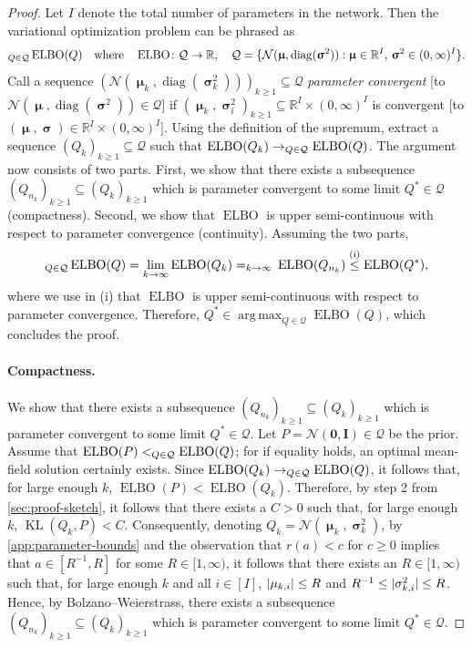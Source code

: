 \documentclass[twoside]{article}
\newcommand{\vnull}{\mathbf{0}}
\newcommand{\vmu}{\bm{\upmu}}
\newcommand{\vsigma}{\bm{\upsigma}}
\newcommand{\mI}{\mathbf{I}}
\newcommand{\Q}{\mathbb{Q}}
\renewcommand{\Q}{\ensuremath{Q}}
\newcommand{\R}{\mathbb{R}}
\newcommand{\sub}{\subseteq}
\newcommand{\opspace}{}
\DeclareMathOperator*{\argmax}{arg\,max\opspace}
\let\sup\relax\DeclareMathOperator*{\sup}{sup\opspace}
\let\limsup\relax\DeclareMathOperator*{\limsup}{lim\,sup\opspace}
\newcommand{\diag}{\operatorname{diag}\opspace}
\newcommand{\KL}{\operatorname{KL}}
\newcommand{\Normal}{\mathcal{N}}
\DeclarePairedDelimiter\set{\{}{\}}              %
\DeclarePairedDelimiter\abs{|}{|}                %
\theoremstyle{theoremstyle}
\begin{document}
\begin{proof}
Let $I$ denote the total number of parameters in the network.
Then the variational optimization problem can be phrased as 
\newcommand{\ELBO}{\operatorname{ELBO}}
\begin{align}
    \sup_{\Q \in \mathcal{Q}} \operatorname{ELBO}(\Q) \quad \text{where}
    \quad \ELBO \colon \mathcal{Q} \to \R,
    \quad \mathcal{Q} = \set{
        \Normal(\vmu, \diag(\vsigma^2)) : \vmu \in \R^I, \, \vsigma^2 \in (0, \infty)^I
    }.
\end{align}
Call a sequence $(\Normal(\vmu_k, \diag(\vsigma_k^2)))_{k \ge 1} \sub \mathcal{Q}$ \emph{parameter convergent} [to $\Normal(\vmu, \diag(\vsigma^2)) \in \mathcal{Q}$] if $(\vmu_k, \vsigma_i^2)_{k \ge 1} \sub \R^I \times (0, \infty)^I$ is convergent [to $(\vmu, \vsigma) \in \R^I \times (0, \infty)^I$].
Using the definition of the supremum, extract a sequence $(Q_k)_{k \ge 1} \sub \mathcal{Q}$ such that $\ELBO(Q_k) \to \sup_{\Q \in \mathcal{Q}} \operatorname{ELBO}(\Q)$.
The argument now consists of two parts.
First, we show that there exists a subsequence $(Q_{n_k})_{k \ge 1} \sub (Q_k)_{k \ge 1}$ which is parameter convergent to some limit $Q^* \in \mathcal{Q}$ (compactness).
Second, we show that $\ELBO$ is upper semi-continuous with respect to parameter convergence (continuity).
Assuming the two parts,
\begin{align}
    \sup_{\Q \in \mathcal{Q}} \operatorname{ELBO}(\Q)
    = \lim_{k \to \infty} \operatorname{ELBO}(\Q_k)
    = \limsup_{k \to \infty}\, \operatorname{ELBO}(\Q_{n_k})
    \overset{\text{(i)}}{\le}  \operatorname{ELBO}(\Q^*),
\end{align}
where we use in (i) that $\ELBO$ is upper semi-continuous with respect to parameter convergence. 
Therefore, $\Q^* \in \argmax_{Q \in \mathcal{Q}} \operatorname{ELBO}(Q)$, which concludes the proof.

\paragraph{Compactness.}
We show that there exists a subsequence $(Q_{n_k})_{k \ge 1} \sub (Q_k)_{k \ge 1}$ which is parameter convergent to some limit $Q^* \in \mathcal{Q}$.
Let $P = \Normal(\vnull, \mI) \in \mathcal{Q}$ be the prior.
Assume that $\ELBO(P) < \sup_{\Q \in \mathcal{Q}} \operatorname{ELBO}(\Q)$; for if equality holds, an optimal mean-field solution certainly exists.
Since $\ELBO(Q_k) \to \sup_{\Q \in \mathcal{Q}} \operatorname{ELBO}(\Q)$, it follows that, for large enough $k$, $\ELBO(P) < \operatorname{ELBO}(\Q_k)$.
Therefore, by step 2 from \cref{sec:proof-sketch}, it follows that there exists a $C > 0$ such that, for large enough $k$, $\KL(Q_k, P) < C$.
Consequently, denoting $Q_k = \Normal(\vmu_k, \vsigma^2_k)$, by \cref{app:parameter-bounds} and the observation that $r(a) < c$ for $c \ge 0$ implies that $a \in [R^{-1}, R]$ for some $R \in [1, \infty)$, it follows that there exists an $R \in [1, \infty)$ such that, for large enough $k$ and all $i \in [I]$, $\abs{\mu_{k,i}} \le R$ and $R^{-1} \le \abs{\sigma^2_{k,i}} \le R$.
Hence, by Bolzano--Weierstrass, there exists a subsequence $(Q_{n_k})_{k \ge 1} \sub (Q_k)_{k \ge 1}$ which is parameter convergent to some limit $Q^* \in \mathcal{Q}$.


\end{proof}
\end{document}
